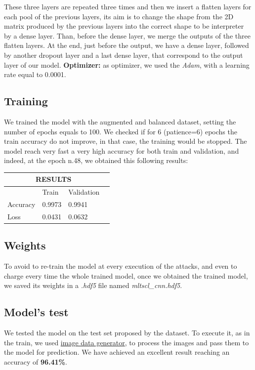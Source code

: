 These three layers are repeated three times and then we insert a flatten layers for each pool of the previous layers, its aim is to change the shape from the 2D matrix produced by the previous layers into the correct shape to be interpreter by a dense layer. 
Than, before the dense layer, we merge the outputs of the three flatten layers.
At the end, just before the output, we have a dense layer, followed by another dropout layer and a last dense layer, that correspond to the output layer of our model.
\textbf{Optimizer:} as optimizer, we used the \textit{Adam}, with a learning rate equal to 0.0001.

\subsection{Training}
We trained the model with the augmented and balanced dataset, setting the number of epochs equals to 100. We checked if for 6 (patience=6) epochs the train accuracy do not improve, in that case, the training would be stopped.
\newline
The model reach very fast a very high accuracy for both train and validation, and indeed, at the epoch n.48, we obtained this following results:\\

\begin{tabular}{ |p{2cm}|p{2cm}|p{2cm}|p{2cm}|  }
 \hline
 \multicolumn{3}{|c|}{RESULTS} \\
 \hline
  & Train &Validation\\
 \hline
Accuracy&  0.9973    &0.9941\\
Loss&   0.0431  &  0.0632\\
 \hline
\end{tabular}

\subsection{Weights}
To avoid to re-train the model at every execution of the attacks, and even to charge every time the whole trained model, once we obtained the trained model, we saved its weights in a \textit{.hdf5} file named \textit{mltscl\_cnn.hdf5}.

\subsection{Model's test}

We tested the model on the test set proposed by the dataset. To execute it, as in the train, we used \href{https://keras.io/preprocessing/image/}{image data generator}, to process the images and pass them to the model for prediction.
We have achieved an excellent result reaching an accuracy of \textbf{96.41\%}. 

